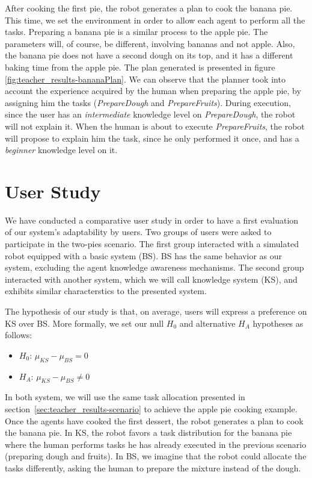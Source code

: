 After cooking the first pie, the robot generates a plan to cook the banana pie. This time, we set the environment in order to allow  each agent to perform all the tasks. Preparing a banana pie is a similar process to the apple pie. The parameters will, of course, be different, involving bananas and not apple. Also, the banana pie does not have a second dough on its top, and it has a different baking time from the apple pie. The plan generated is presented in figure \ref{fig:teacher_results-bananaPlan}. We can observe that the planner took into account the experience acquired by the human when preparing the apple pie, by assigning him the tasks (\textit{PrepareDough} and \textit{PrepareFruits}). During execution, since the user has an \textit{intermediate} knowledge level on \textit{PrepareDough}, the robot will not explain it. When the human is about to execute \textit{PrepareFruits}, the robot will propose to explain him the task, since he only performed it once, and has a \textit{beginner} knowledge level on it.


\section{User Study}
We have conducted a comparative user study in order to have a first evaluation of our system's adaptability by users. Two groups of users were asked to participate in the two-pies scenario. The first group interacted with a simulated robot equipped with a basic system (BS). BS has the same behavior as our system, excluding the agent knowledge awareness mechanisms. The second group interacted with another system, which we will call knowledge system (KS), and exhibits similar characterstics to the presented system.

The hypothesis of our study is that, on average, users will express a preference on KS over BS. More formally, we set our null $H_0$ and alternative $H_A$ hypotheses as follows:
\begin{itemize}
\item $H_0$: $\mu_{KS}-\mu_{BS}=0$ 
\item $H_A$: $\mu_{KS}-\mu_{BS} \neq 0$  
\end{itemize}


In both system, we will use the same task allocation presented in section~\ref{sec:teacher_results-scenario} to achieve the apple pie cooking example. Once the agents have cooked the first dessert, the robot generates a plan to cook the banana pie. 
In KS,  the robot favors a task distribution for the banana pie where the human performs tasks he has already executed in the previous scenario (preparing dough and fruits).
In BS, we imagine that the robot could allocate the tasks differently, asking the human to prepare the mixture instead of the dough.


